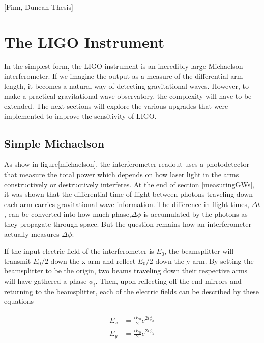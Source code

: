 	[Finn, Duncan Thesis]
	\cite{Saulson}
	
	\section{The LIGO Instrument}\label{LIGOInstrument}
	In the simplest form, the LIGO instrument is an incredibly large Michaelson interferometer.  If we imagine the output as a measure of the differential arm length, it becomes a natural way of detecting gravitational waves. However, to make a practical gravitational-wave observatory, the complexity will have to be extended.  The next sections will explore the various upgrades that were implemented to improve the sensitivity of LIGO.
	
		\subsection{Simple Michaelson}\label{michelson}
		As show in figure[michaelson], the interferometer readout uses a photodetector that measure the total power which depends on how laser light in the arms constructively or destructively interferes.  
		At the end of section \ref{measuringGWs}, it was shown that the differential time of flight between photons traveling down each arm carries gravitational wave information.  The difference in flight times, $\Delta t$, can be converted into how much phase,$\Delta \phi$ is accumulated by the photons as they propagate through space.  But the question remains how an interferometer actually measures $\Delta \phi$:
		
		If the input electric field of the interferometer is $E_0$, the beamsplitter will transmit $E_0 /2$ down the x-arm and reflect $E_0 /2$ down the y-arm.  By setting the beamsplitter to be the origin,  two beams traveling down their respective arms will have gathered a phase $\phi_i$. Then, upon reflecting off the end mirrors and returning to the beamsplitter, each of the electric fields can be described by these equations
		
			\begin{equation}
			\begin{aligned}
				E_{x} 	&=	\frac{i E_0}{2} e^{2i\phi_{x}}	
			\\	E_{y} 	&=	\frac{i E_0}{2} e^{2i\phi_{y}}
			\end{aligned}
			\end{equation}
			
